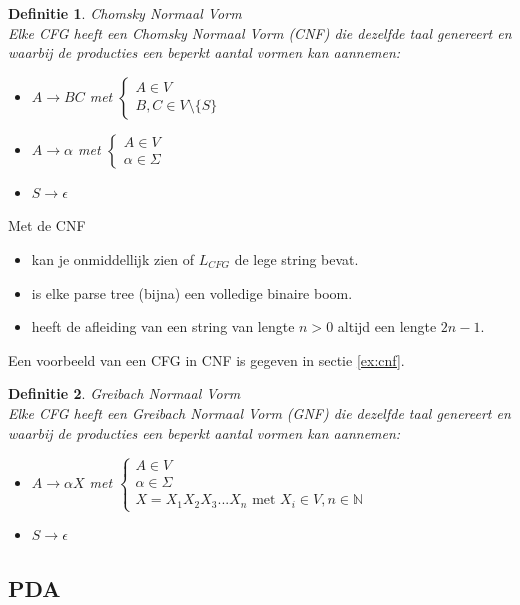 \documentclass[a4paper]{article}
\newtheorem{tdefinitie}{Definitie}[section]
\newenvironment{definitie}[1]%
  {\begin{mdframed}[backgroundcolor=silver,
    topline=false,
    rightline=false,
    leftline=false,
    bottomline=false]\begin{tdefinitie}#1\\\normalfont}%
  {\end{tdefinitie}\end{mdframed}}
\newcommand{\nat}{\ensuremath{\mathbb{N}}}
\begin{document}
\begin{definitie}{Chomsky Normaal Vorm}
  \label{def:cnf}
  Elke CFG heeft een Chomsky Normaal Vorm (CNF) die dezelfde taal genereert en waarbij de producties een beperkt aantal vormen kan aannemen:
  \begin{itemize}
  \item $A \rightarrow BC$ met $\begin{cases}A \in V \\ B,C \in V \setminus \{S\}\end{cases}$
  \item $A \rightarrow \alpha$ met $\begin{cases}A \in V \\ \alpha \in \Sigma\end{cases}$
  \item $S \rightarrow \epsilon$
  \end{itemize}
\end{definitie}

Met de CNF
\begin{itemize}
\item kan je onmiddellijk zien of $L_{CFG}$ de lege string bevat.
\item is elke parse tree (bijna) een volledige binaire boom.
\item heeft de afleiding van een string van lengte $n > 0$ altijd een lengte $2n-1$.
\end{itemize}

Een voorbeeld van een CFG in CNF is gegeven in sectie \ref{ex:cnf}.


\begin{definitie}{Greibach Normaal Vorm}
  Elke CFG heeft een Greibach Normaal Vorm (GNF) die dezelfde taal genereert en waarbij de producties een beperkt aantal vormen kan aannemen:
  \begin{itemize}
  \item $A \rightarrow \alpha X$ met $\begin{cases}A \in V \\ \alpha \in \Sigma \\ X = X_1X_2X_3...X_n \text{ met } X_i \in V, n \in \nat\end{cases}$
  \item $S \rightarrow \epsilon$
  \end{itemize}
\end{definitie}

\subsection{PDA}
\end{document}
